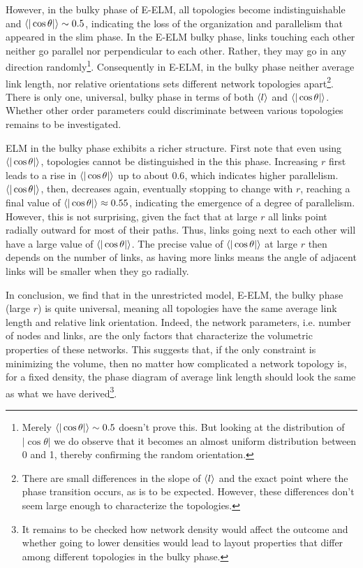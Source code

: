 \documentclass[nofootinbib,preprint,endfloats]{revtex4} %
\begin{document}
However, in the bulky phase of E-ELM, all topologies become indistinguishable and $\be{|\cos\theta|} \sim 0.5 $, indicating the loss of the organization and parallelism that appeared in the slim phase. 
In the E-ELM bulky phase, links touching each other neither go parallel nor perpendicular to each other.
Rather, they may go in any direction randomly\footnote{Merely  $\be{|\cos\theta|} \sim 0.5 $ doesn't prove this. But looking at the distribution of $|\cos\theta|$ we do observe that it becomes an almost uniform distribution between 0 and 1, thereby confirming the random orientation.}. 
Consequently in E-ELM, %
in the bulky phase %
neither average link length, nor relative orientations sets different network topologies apart\footnote{
There are small differences in the slope of $\left<l\right>$ and the exact point where the phase transition occurs, as is to be expected.
However, these differences don't seem large enough to characterize the topologies.}. 
There is only one, universal, bulky phase in terms of both $\left<l\right>$ and $\be{|\cos\theta|}$. 
Whether other order parameters could discriminate between various topologies remains to be investigated. 

ELM in the bulky phase exhibits a richer structure. 
First note that even using $\be{|\cos\theta|} $, topologies cannot be distinguished in the this phase. 
Increasing $r$ first leads to a rise in $\be{|\cos\theta|} $ up to about $0.6$, which indicates higher parallelism. 
$\be{|\cos\theta|}$, then, decreases again, eventually stopping to change with $r$, reaching a final value of $\be{|\cos\theta|} \approx 0.55 $, indicating the emergence of a degree of parallelism. 
However, this is not surprising, given the fact that at large $r$ all links point radially outward for most of their paths. Thus, links going next to each other will have a large value of  $\be{|\cos\theta|}$. The precise value of $\be{|\cos\theta|}$ at large $r$ then depends on the number of links, as having more links means the angle of adjacent links will be smaller when they go radially. 

In conclusion, we find that in the unrestricted model, E-ELM, the bulky phase (large $r$) is quite universal, meaning all topologies have the same average link length and relative link orientation.   
Indeed, the network parameters, i.e. number of nodes and links, are the only factors that characterize the volumetric properties of these networks. 
This suggests that, if the only constraint is minimizing the volume, then no matter how complicated a network topology is, for a fixed density, the phase diagram of average link length should look the same as what we have derived\footnote{
It remains to be checked how network density would affect the outcome and whether going to lower densities would lead to layout properties that differ among different topologies in the bulky phase.}.
\end{document}
